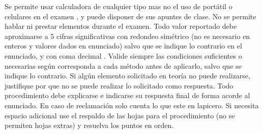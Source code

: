 \documentclass[12pt]{article}
\begin{document}
{\scriptsize
Se permite usar calculadora de cualquier tipo mas no el uso de portátil o celulares en el examen%
, y puede disponer de sus apuntes de clase. %
No se permite hablar ni prestar elementos durante el examen. %
Todo valor reportado debe aproximarse a 5 cifras significativas con redondeo simétrico (no es necesario en enteros y valores dados en enunciado) salvo que se indique lo contrario en el enunciado, y con coma decimal%
.
Valide siempre las condiciones suficientes o necesarias según corresponda a cada método antes de aplicarlo, salvo que se indique lo contrario. Si algún elemento solicitado en teoría no puede realizarse, justifique por que no se puede realizar lo solicitado como respuesta. Todo procedimiento debe explicarse e indicarse su respuesta final de forma acorde al enunciado. %
En caso de reclamación solo cuenta lo que este en lapicero. %
Si necesita espacio adicional %
use el respaldo de las hojas para el procedimiento (no se permiten hojas extras) y resuelva los puntos en orden. %
}
\vspace{-.5cm}
\end{document}
